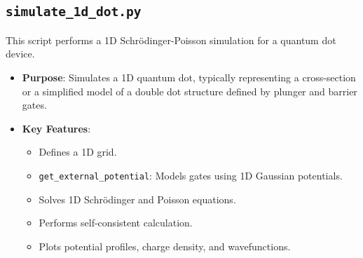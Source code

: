 \documentclass{article}
\begin{document}
\subsection{\texttt{simulate\_1d\_dot.py}}
This script performs a 1D Schrödinger-Poisson simulation for a quantum dot device.
\begin{itemize}
    \item \textbf{Purpose}: Simulates a 1D quantum dot, typically representing a cross-section or a simplified model of a double dot structure defined by plunger and barrier gates.
    \item \textbf{Key Features}:
        \begin{itemize}
            \item Defines a 1D grid.
            \item \texttt{get\_external\_potential}: Models gates using 1D Gaussian potentials.
            \item Solves 1D Schrödinger and Poisson equations.
            \item Performs self-consistent calculation.
            \item Plots potential profiles, charge density, and wavefunctions.
        \end{itemize}
\end{itemize}
\end{document}
